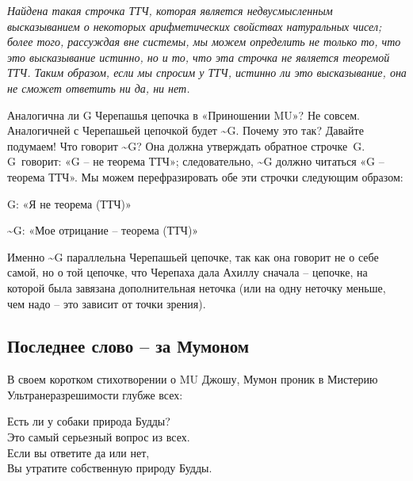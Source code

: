 \documentclass[../main.tex]{subfiles}
\begin{document}
\emph{Найдена такая строчка ТТЧ, которая является недвусмысленным высказыванием о некоторых арифметических свойствах натуральных чисел; более того, рассуждая вне системы, мы можем определить не только то, что это высказывание истинно, но и то, что эта строчка не является теоремой ТТЧ\@. Таким образом, если мы спросим у ТТЧ, истинно ли это высказывание, она не сможет ответить ни да, ни нет.}

Аналогична ли G Черепашья цепочка в «Приношении MU»? Не совсем. Аналогичней с Черепашьей цепочкой будет \textasciitilde G\@. Почему это так? Давайте подумаем! Что говорит \textasciitilde G? Она должна утверждать обратное строчке~G\@. G~говорит: «G \--- не теорема ТТЧ»; следовательно, \textasciitilde G должно читаться «G \--- теорема ТТЧ». Мы можем перефразировать обе эти строчки следующим образом:

G: «Я не теорема (ТТЧ)»

\textasciitilde G: «Мое отрицание \--- теорема (ТТЧ)»

Именно \textasciitilde G параллельна Черепашьей цепочке, так как она говорит не о себе самой, но о той цепочке, что Черепаха дала Ахиллу сначала \--- цепочке, на которой была завязана дополнительная неточка (или на одну неточку меньше, чем надо \--- это зависит от точки зрения).


\subsection{Последнее слово \--- за Мумоном}

В своем коротком стихотворении о MU Джошу, Мумон проник в Мистерию Ультранеразрешимости глубже всех:

\settowidth{\dimen42}{Вы утратите собственную природу Будды.}
\begin{koan}[center, text width=\dimen42, fontupper=\normalsize]
    Есть ли у собаки природа Будды? \\
    Это самый серьезный вопрос из всех. \\
    Если вы ответите да или нет, \\
    Вы утратите собственную природу Будды.
\end{koan}

\endgroup
\end{document}
